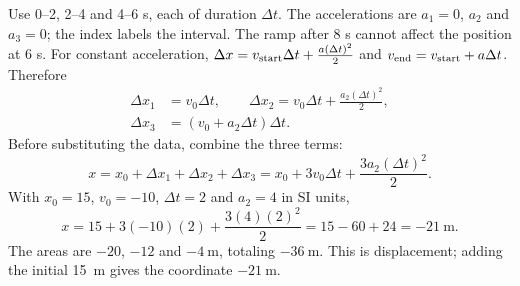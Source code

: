 \begin{problem}[25 pts]
\end{problem}
\begin{solution}
Use 0--2, 2--4 and 4--6 s, each of duration $\Delta t$.
The accelerations are $a_1=0$, $a_2$ and $a_3=0$; the index labels the interval.
The ramp after 8 s cannot affect the position at 6 s.
For constant acceleration,
$\Delta x=v_{\rm start}\Delta t+\frac{a(\Delta t)^2}{2}$ and
$v_{\rm end}=v_{\rm start}+a\Delta t$. Therefore
\[
\begin{aligned}
\Delta x_1&=v_0\Delta t,\qquad
\Delta x_2=v_0\Delta t+\frac{a_2(\Delta t)^2}{2},\\
\Delta x_3&=(v_0+a_2\Delta t)\Delta t.
\end{aligned}
\]
Before substituting the data, combine the three terms:
\[
x=x_0+\Delta x_1+\Delta x_2+\Delta x_3
=x_0+3v_0\Delta t+\frac{3a_2(\Delta t)^2}{2}.
\]
With $x_0=15$, $v_0=-10$, $\Delta t=2$ and $a_2=4$ in SI units,
\[
x=15+3(-10)(2)+\frac{3(4)(2)^2}{2}
=15-60+24=-\qty{21}{\metre}.
\]
The areas are $-20$, $-12$ and $-\qty{4}{\metre}$, totaling
$-\qty{36}{\metre}$. This is displacement; adding the initial
\qty{15}{\metre} gives the coordinate $-\qty{21}{\metre}$.
\end{solution}


